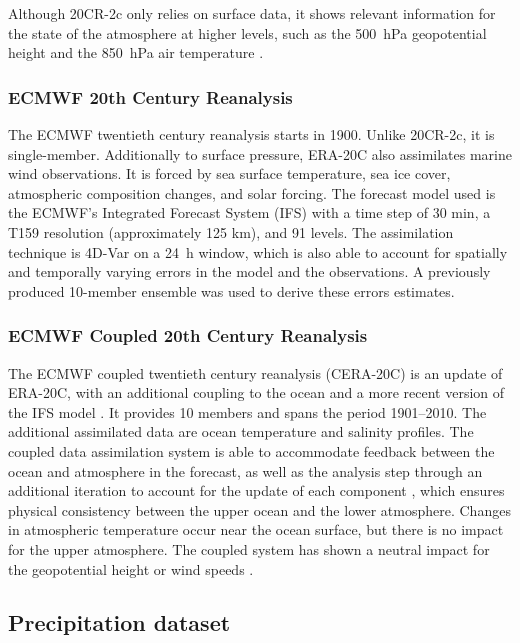 \documentclass{ametsoc}
\begin{document}
	Although 20CR-2c only relies on surface data, it shows relevant information for the state of the atmosphere at higher levels, such as the 500~hPa geopotential height and the 850~hPa air temperature \citep{Compo2011}.
	
	
	\subsubsection{ECMWF 20th Century Reanalysis}
	
	The ECMWF twentieth century reanalysis \citep[ERA-20C --][]{Poli2016} starts in 1900. Unlike 20CR-2c, it is single-member. Additionally to surface pressure, ERA-20C also assimilates marine wind observations. It is forced by sea surface temperature, sea ice cover, atmospheric composition changes, and solar forcing. The forecast model used is the ECMWF’s Integrated Forecast System (IFS) with a time step of 30 min, a T159 resolution (approximately 125 km), and 91 levels. The assimilation technique is 4D-Var on a 24~h window, which is also able to account for spatially and temporally varying errors in the model and the observations. A previously produced 10-member ensemble was used to derive these errors estimates.
	
	
	\subsubsection{ECMWF Coupled 20th Century Reanalysis}
	
	The ECMWF coupled twentieth century reanalysis (CERA-20C) is an update of ERA-20C, with an additional coupling to the ocean and a more recent version of the IFS model \citep{Laloyaux2017}. It provides 10 members and spans the period 1901--2010. The additional assimilated data are ocean temperature and salinity profiles. The coupled data assimilation system is able to accommodate feedback between the ocean and atmosphere in the forecast, as well as the analysis step through an additional iteration to account for the update of each component \citep{Laloyaux2016}, which ensures physical consistency between the upper ocean and the lower atmosphere. Changes in atmospheric temperature occur near the ocean surface, but there is no impact for the upper atmosphere. The coupled system has shown a neutral impact for the geopotential height or wind speeds \citep{Laloyaux2016}.
	
	
	
	\subsection{Precipitation dataset}
	\label{sec:precip}
	
\end{document}
